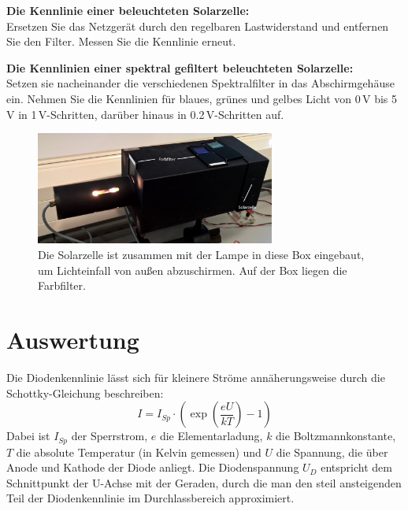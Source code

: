 \begin{enumerate}
	\begin{minipage}{0.4\textwidth}
			\item \textbf{Die Kennlinie einer beleuchteten Solarzelle:}\\
		Ersetzen Sie das Netzgerät durch den regelbaren Lastwiderstand und entfernen Sie den Filter. Messen Sie die Kennlinie erneut.
		\vfill
	\end{minipage}
	\begin{minipage}{0.55\textwidth}
		\hfill
		
		\label{fig:solarzelle }
		\end{minipage}
	\item \textbf{Die Kennlinien einer spektral gefiltert beleuchteten Solarzelle:}\\
		Setzen sie nacheinander die verschiedenen Spektralfilter in das Abschirmgehäuse ein. Nehmen Sie die Kennlinien für blaues, grünes und gelbes Licht von 0\,V bis 5\,V in 1\,V-Schritten, darüber hinaus in 0.2\,V-Schritten auf.
\end{enumerate}

\begin{figure}[h]
	\centering
	\includegraphics[width=0.7\textwidth]{Abbildungen/Solarzelle_gross.jpg}
	\caption{Die Solarzelle ist zusammen mit der Lampe in diese Box eingebaut, um Lichteinfall von außen abzuschirmen. Auf der Box liegen die Farbfilter.}
\end{figure}

\section{Auswertung} 

Die Diodenkennlinie lässt sich für kleinere Ströme annäherungsweise durch die Schottky-Gleichung beschreiben:
\begin{equation}
I = I_{Sp}\cdot\left(\exp\left(\frac{eU}{kT}\right)-1\right)
\end{equation}
Dabei ist $I_{Sp}$ der Sperrstrom, $e$ die Elementarladung, $k$ die Boltzmannkonstante, $T$ die absolute Temperatur (in Kelvin gemessen) und $U$ die Spannung, die über Anode und Kathode der Diode anliegt. Die Diodenspannung $U_D$ entspricht dem Schnittpunkt der U-Achse mit der Geraden, durch die man den steil ansteigenden Teil der Diodenkennlinie im Durchlassbereich approximiert.

